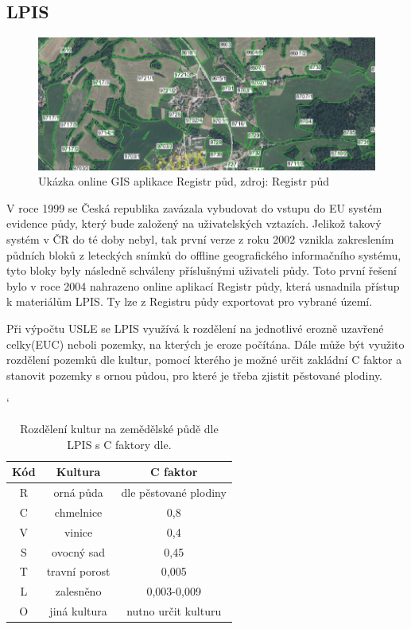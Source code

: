 \subsection{LPIS}
\begin{figure}[H]
    \centering \includegraphics[scale=0.75]{./pictures/lpis.png}
      \caption[Ukázka GIS online aplikace Registr půd]{Ukázka online
        GIS aplikace Registr půd, zdroj: Registr půd\cite{lpis}}
      \label{fig:lpis}
\end{figure}
V roce 1999 se Česká republika zavázala vybudovat do vstupu do EU
systém evidence půdy, který bude založený na uživatelských
vztazích. Jelikož takový systém v ČR do té doby nebyl, tak první verze
z roku 2002 vznikla zakreslením půdních bloků z leteckých snímků do
offline geografického informačního systému, tyto bloky byly následně
schváleny příslušnými uživateli půdy. Toto první řešení bylo v roce
2004 nahrazeno online aplikací Registr půdy\cite{lpis}, která
usnadnila přístup k materiálům LPIS. Ty lze z Registru půdy exportovat
pro vybrané území.\cite{lpis}

Při výpočtu USLE se LPIS využívá k rozdělení na jednotlivé erozně
uzavřené celky(EUC) neboli pozemky, na kterých je eroze počítána. Dále
může být využito rozdělení pozemků dle kultur, pomocí kterého je možné
určit zakládní C faktor a stanovit pozemky s ornou půdou, pro které je
třeba zjistit pěstované plodiny.\cite{Novotny2014}
\begin{table}[!h]
\begin{center}
\catcode`
    \noindent\begin{tabular}{|*{3}{c|}} \hline \bf Kód & \bf Kultura &
    \bf C faktor\\ \hline R & orná půda & dle pěstované
    plodiny\\ \hline C & chmelnice & 0,8\\ \hline V & vinice &
    0,4\\ \hline S & ovocný sad & 0,45\\ \hline T & travní porost &
    0,005\\ \hline L & zalesněno & 0,003-0,009\\ \hline O & jiná
    kultura & nutno určit kulturu\\ \hline
    \end{tabular}\\
  \caption[Rozdělení kultur na zemědělské půdě dle LPIS]{Rozdělení
    kultur na zemědělské půdě dle LPIS\cite{lpis} s C faktory
    dle\cite{janecek2012}.}
  \label{tabulka_ohrozenost}
\end{center}
\end{table}
\FloatBarrier
